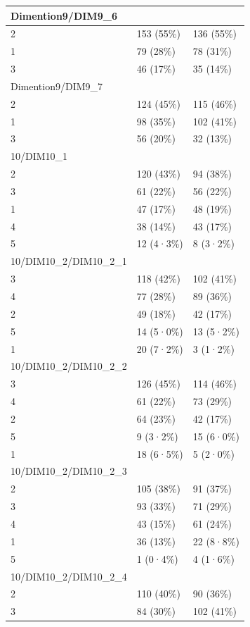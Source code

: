 \documentclass[
]{book}
\begin{document}
\begin{tabular}{l|l|l}
\hline
Dimention9/DIM9\_6 &  & \\
\hline
2 & 153 (55\%) & 136 (55\%)\\
\hline
1 & 79 (28\%) & 78 (31\%)\\
\hline
3 & 46 (17\%) & 35 (14\%)\\
\hline
Dimention9/DIM9\_7 &  & \\
\hline
2 & 124 (45\%) & 115 (46\%)\\
\hline
1 & 98 (35\%) & 102 (41\%)\\
\hline
3 & 56 (20\%) & 32 (13\%)\\
\hline
10/DIM10\_1 &  & \\
\hline
2 & 120 (43\%) & 94 (38\%)\\
\hline
3 & 61 (22\%) & 56 (22\%)\\
\hline
1 & 47 (17\%) & 48 (19\%)\\
\hline
4 & 38 (14\%) & 43 (17\%)\\
\hline
5 & 12 (4·3\%) & 8 (3·2\%)\\
\hline
10/DIM10\_2/DIM10\_2\_1 &  & \\
\hline
3 & 118 (42\%) & 102 (41\%)\\
\hline
4 & 77 (28\%) & 89 (36\%)\\
\hline
2 & 49 (18\%) & 42 (17\%)\\
\hline
5 & 14 (5·0\%) & 13 (5·2\%)\\
\hline
1 & 20 (7·2\%) & 3 (1·2\%)\\
\hline
10/DIM10\_2/DIM10\_2\_2 &  & \\
\hline
3 & 126 (45\%) & 114 (46\%)\\
\hline
4 & 61 (22\%) & 73 (29\%)\\
\hline
2 & 64 (23\%) & 42 (17\%)\\
\hline
5 & 9 (3·2\%) & 15 (6·0\%)\\
\hline
1 & 18 (6·5\%) & 5 (2·0\%)\\
\hline
10/DIM10\_2/DIM10\_2\_3 &  & \\
\hline
2 & 105 (38\%) & 91 (37\%)\\
\hline
3 & 93 (33\%) & 71 (29\%)\\
\hline
4 & 43 (15\%) & 61 (24\%)\\
\hline
1 & 36 (13\%) & 22 (8·8\%)\\
\hline
5 & 1 (0·4\%) & 4 (1·6\%)\\
\hline
10/DIM10\_2/DIM10\_2\_4 &  & \\
\hline
2 & 110 (40\%) & 90 (36\%)\\
\hline
3 & 84 (30\%) & 102 (41\%)\\

\end{tabular}
\end{document}
